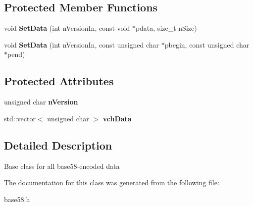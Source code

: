 \subsection*{Protected Member Functions}
\begin{DoxyCompactItemize}
\item 
\mbox{\label{class_c_base58_data_a38e0f31e608149e9b624886a76f992da}} 
void {\bfseries Set\+Data} (int n\+Version\+In, const void $\ast$pdata, size\+\_\+t n\+Size)
\item 
\mbox{\label{class_c_base58_data_a3580fa342de740028467cf8b42f7b68e}} 
void {\bfseries Set\+Data} (int n\+Version\+In, const unsigned char $\ast$pbegin, const unsigned char $\ast$pend)
\end{DoxyCompactItemize}
\subsection*{Protected Attributes}
\begin{DoxyCompactItemize}
\item 
\mbox{\label{class_c_base58_data_a64d6e1f707bbf6ef3d4245fc01992d5f}} 
unsigned char {\bfseries n\+Version}
\item 
\mbox{\label{class_c_base58_data_ada2b05d231e99b8254f499b85645ce9d}} 
std\+::vector$<$ unsigned char $>$ {\bfseries vch\+Data}
\end{DoxyCompactItemize}


\subsection{Detailed Description}
Base class for all base58-\/encoded data 

The documentation for this class was generated from the following file\+:\begin{DoxyCompactItemize}
\item 
base58.\+h\end{DoxyCompactItemize}
